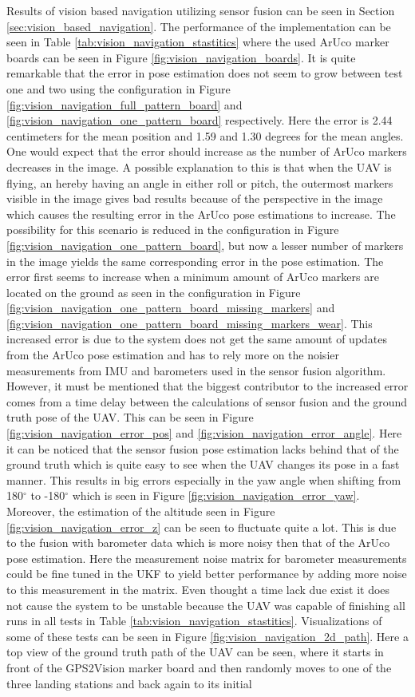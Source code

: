 \documentclass[../Head/report.tex]{subfiles}
\begin{document}
Results of vision based navigation utilizing sensor fusion can be seen in Section \ref{sec:vision_based_navigation}. The performance of the implementation can be seen in Table \ref{tab:vision_navigation_stastitics} where the used ArUco marker boards can be seen in Figure \ref{fig:vision_navigation_boards}. It is quite remarkable that the error in pose estimation does not seem to grow between test one and two using the configuration in Figure \ref{fig:vision_navigation_full_pattern_board} and \ref{fig:vision_navigation_one_pattern_board} respectively. Here the error is 2.44 centimeters for the mean position and 1.59 and 1.30 degrees for the mean angles. One would expect that the error should increase as the number of ArUco markers decreases in the image. A possible explanation to this is that when the UAV is flying, an hereby having an angle in either roll or pitch, the outermost markers visible in the image gives bad results because of the perspective in the image which causes the resulting error in the ArUco pose estimations to increase. The possibility for this scenario is reduced in the configuration in Figure \ref{fig:vision_navigation_one_pattern_board}, but now a lesser number of markers in the image yields the same corresponding error in the pose estimation. The error first seems to increase when a minimum amount of ArUco markers are located on the ground as seen in the configuration in Figure \ref{fig:vision_navigation_one_pattern_board_missing_markers} and \ref{fig:vision_navigation_one_pattern_board_missing_markers_wear}. This increased error is due to the system does not get the same amount of updates from the ArUco pose estimation and has to rely more on the noisier measurements from IMU and barometers used in the sensor fusion algorithm. However, it must be mentioned that the biggest contributor to the increased error comes from a time delay between the calculations of sensor fusion and the ground truth pose of the UAV. This can be seen in Figure \ref{fig:vision_navigation_error_pos} and \ref{fig:vision_navigation_error_angle}. Here it can be noticed that the sensor fusion pose estimation lacks behind that of the ground truth which is quite easy to see when the UAV changes its pose in a fast manner. This results in big errors especially in the yaw angle when shifting from 180$^{\circ}$ to -180$^{\circ}$ which is seen in Figure \ref{fig:vision_navigation_error_yaw}. Moreover, the estimation of the altitude seen in Figure \ref{fig:vision_navigation_error_z} can be seen to fluctuate quite a lot. This is due to the fusion with barometer data which is more noisy then that of the ArUco pose estimation. Here the measurement noise matrix for barometer measurements could be fine tuned in the UKF to yield better performance by adding more noise to this measurement in the matrix. Even thought a time lack due exist it does not cause the system to be unstable because the UAV was capable of finishing all runs in all tests in Table \ref{tab:vision_navigation_stastitics}. Visualizations of some of these tests can be seen in Figure \ref{fig:vision_navigation_2d_path}. Here a top view of the ground truth path of the UAV can be seen, where it starts in front of the GPS2Vision marker board and then randomly moves to one of the three landing stations and back again to its initial 
\end{document}
